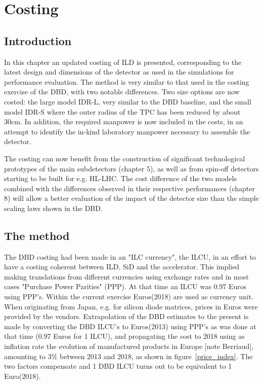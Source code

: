 \chapter{Costing}
\label{chap:costing}
\section{Introduction}
In this chapter an updated costing of ILD is presented, corresponding to the latest design and dimensions of the detector as used in the simulations for performance evaluation. The method is very similar to that used in the costing exercise of the DBD, with two notable differences. Two size options are now costed: the large model IDR-L, very similar to the DBD baseline, and the small model IDR-S where the outer radius of the TPC has been reduced by about 30cm. In addition, the required manpower is now included in the costs, in an attempt to identify the in-kind laboratory manpower necessary to assemble the detector. 

The costing can now benefit from the construction of significant technological prototypes of the main subdetectors (chapter 5), as well as from spin-off detectors starting to be built for e.g. HL-LHC. The cost difference of the two models combined with the differences observed in their respective performances (chapter 8) will allow a better evaluation of the impact of the detector size than the simple scaling laws shown in the DBD. 

\section{The method}
The DBD costing had been made in an "ILC currency", the ILCU, in an effort to have a costing coherent between ILD, SiD and the accelerator. This implied making translations from different currencies using exchange rates and in most cases "Purchase Power Parities" (PPP). At that time an ILCU was 0.97 Euros using PPP's. Within the current exercise Euros(2018) are used as currency unit. When originating from Japan, e.g. for silicon diode matrices, prices in Euros were provided by the vendors. Extrapolation of the DBD estimates to the present is made by converting the DBD ILCU's to Euros(2013) using PPP's as was done at that time (0.97 Euros for 1 ILCU), and propagating the cost to 2018 using as inflation rate the evolution of manufactured products in Europe [note Berriaud], amounting to 3\% between 2013 and 2018, as shown in figure~\ref{price_index}. The two factors compensate and 1 DBD ILCU turns out to be equivalent to 1 Euro(2018). 

